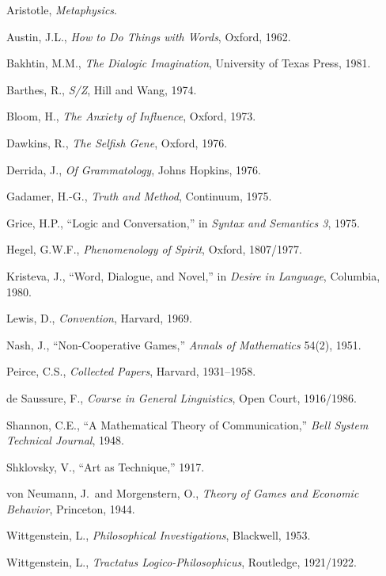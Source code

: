 \documentclass[11pt,oneside]{book}
\theoremstyle{plain}
\theoremstyle{definition}
\theoremstyle{remark}
\begin{document}
\begin{enumerate}[label={[\arabic*]}]
\item Aristotle, \emph{Metaphysics}.
\item Austin, J.L., \emph{How to Do Things with Words}, Oxford, 1962.
\item Bakhtin, M.M., \emph{The Dialogic Imagination}, University of Texas Press, 1981.
\item Barthes, R., \emph{S/Z}, Hill and Wang, 1974.
\item Bloom, H., \emph{The Anxiety of Influence}, Oxford, 1973.
\item Dawkins, R., \emph{The Selfish Gene}, Oxford, 1976.
\item Derrida, J., \emph{Of Grammatology}, Johns Hopkins, 1976.
\item Gadamer, H.-G., \emph{Truth and Method}, Continuum, 1975.
\item Grice, H.P., ``Logic and Conversation,'' in \emph{Syntax and Semantics 3}, 1975.
\item Hegel, G.W.F., \emph{Phenomenology of Spirit}, Oxford, 1807/1977.
\item Kristeva, J., ``Word, Dialogue, and Novel,'' in \emph{Desire in Language}, Columbia, 1980.
\item Lewis, D., \emph{Convention}, Harvard, 1969.
\item Nash, J., ``Non-Cooperative Games,'' \emph{Annals of Mathematics} 54(2), 1951.
\item Peirce, C.S., \emph{Collected Papers}, Harvard, 1931--1958.
\item de Saussure, F., \emph{Course in General Linguistics}, Open Court, 1916/1986.
\item Shannon, C.E., ``A Mathematical Theory of Communication,'' \emph{Bell System Technical Journal}, 1948.
\item Shklovsky, V., ``Art as Technique,'' 1917.
\item von Neumann, J.\ and Morgenstern, O., \emph{Theory of Games and Economic Behavior}, Princeton, 1944.
\item Wittgenstein, L., \emph{Philosophical Investigations}, Blackwell, 1953.
\item Wittgenstein, L., \emph{Tractatus Logico-Philosophicus}, Routledge, 1921/1922.
\end{enumerate}
\end{document}
